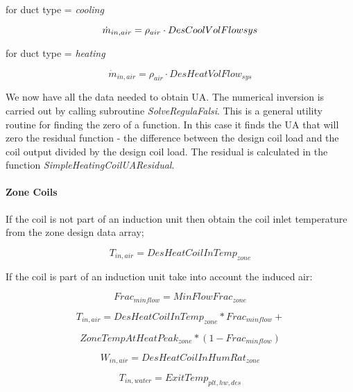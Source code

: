 for duct type = \emph{cooling}

\begin{equation}
\emph{\(\dot m_{in,air} = \rho_{air} \cdot DesCoolVolFlowsys\)}
\end{equation}

for duct type = \emph{heating}

\begin{equation}
\dot m_{in,air} = \rho_{air} \cdot DesHeatVolFlow_{sys}
\end{equation}

We now have all the data needed to obtain UA. The numerical inversion is carried out by calling subroutine \emph{SolveRegulaFalsi}. This is a general utility routine for finding the zero of a function. In this case it finds the UA that will zero the residual function - the difference between the design coil load and the coil output divided by the design coil load. The residual is calculated in the function \emph{SimpleHeatingCoilUAResidual}.

\paragraph{Zone Coils}\label{zone-coils-1}

If the coil is not part of an induction unit then obtain the coil inlet temperature from the zone design data array;

\begin{equation}
T_{in,air} = DesHeatCoilInTemp_{zone}
\end{equation}

If the coil is part of an induction unit take into account the induced air:

\begin{equation}
Frac_{minflow} = MinFlowFrac_{zone}
\end{equation}

\begin{equation}
T_{in,air} = DesHeatCoilInTemp_{zone} * Frac_{minflow} +
\end{equation}

\begin{equation}
ZoneTempAtHeatPeak_{zone} *(1- Frac_{minflow})
\end{equation}

\begin{equation}
W_{in,air} = DesHeatCoilInHumRat_{zone}
\end{equation}

\begin{equation}
T_{in,water} = ExitTemp_{plt,hw,des}
\end{equation}

